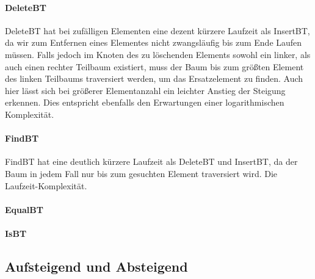 \documentclass[11pt]{article}
\begin{document}
        \paragraph{DeleteBT}  
        
        DeleteBT hat bei zufälligen Elementen eine dezent kürzere Laufzeit als InsertBT,
        da wir zum Entfernen eines Elementes nicht zwangsläufig bis zum Ende Laufen müssen.
        Falls jedoch im Knoten des zu löschenden Elements sowohl ein linker,
        als auch einen rechter Teilbaum existiert,
        muss der Baum bis zum größten Element des linken Teilbaums traversiert werden,
        um das Ersatzelement zu finden.
        Auch hier lässt sich bei größerer Elementanzahl ein leichter Anstieg der Steigung erkennen.
        Dies entspricht ebenfalls den Erwartungen einer logarithmischen Komplexität.

        \paragraph{FindBT}
        
        FindBT hat eine deutlich kürzere Laufzeit als DeleteBT und InsertBT,
        da der Baum in jedem Fall nur bis zum gesuchten Element traversiert wird.
        Die Laufzeit-Komplexität.

        \paragraph{EqualBT}

        \paragraph{IsBT}

    \subsection{Aufsteigend und Absteigend}\label{subsec:average}
\end{document}
